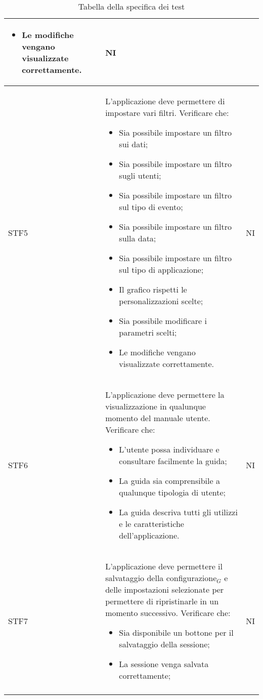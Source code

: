 \begin{center}
\begin{longtable}{|p{1.5cm}|p{11cm}|p{1cm}|}
\begin{itemize}
            \item Le modifiche vengano visualizzate correttamente.
        \end{itemize} & NI\\ \hline
        \rowcolor[HTML]{C0C0C0}
        STF5 & L'applicazione deve permettere di impostare vari filtri. Verificare che: \begin{itemize}
            \item Sia possibile impostare un filtro sui dati;
            \item Sia possibile impostare un filtro sugli utenti;
            \item Sia possibile impostare un filtro sul tipo di evento;
            \item Sia possibile impostare un filtro sulla data;
            \item Sia possibile impostare un filtro sul tipo di applicazione;
            \item Il grafico rispetti le personalizzazioni scelte;
            \item Sia possibile modificare i parametri scelti;
            \item Le modifiche vengano visualizzate correttamente.
        \end{itemize} & NI\\ \hline
        \rowcolor[HTML]{EFEFEF}
        STF6 & L'applicazione deve permettere la visualizzazione in qualunque momento del manuale utente. Verificare che: \begin{itemize}
            \item L'utente possa individuare e consultare facilmente la guida;
            \item La guida sia comprensibile a qualunque tipologia di utente;
            \item La guida descriva tutti gli utilizzi e le caratteristiche dell'applicazione.
        \end{itemize} & NI\\ \hline
        \rowcolor[HTML]{C0C0C0}
        STF7 & L'applicazione deve permettere il salvataggio della configurazione$_G$ e delle impostazioni selezionate per permettere di ripristinarle in un momento successivo. Verificare che: \begin{itemize}
            \item Sia disponibile un bottone per il salvataggio della sessione;
            \item La sessione venga salvata correttamente;
        \end{itemize}& NI\\ \hline
        \caption{Tabella della specifica dei test}
    \end{longtable}
\end{center}

